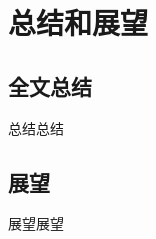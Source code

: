 \chapter{总结和展望}
\label{cha:chap6}
\section{全文总结}
\label{sec:6.1}
总结总结
\
\section{展望}
\label{sec:6.2}
展望展望
